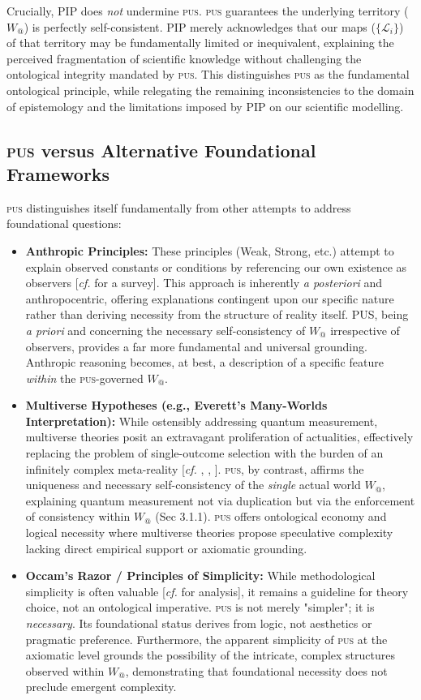 \documentclass[11pt, a4paper]{article}
\makeatletter
\newcommand{\pus}{\textsc{pus}} %
\newcommand{\Wactual}{W_{@}} %
\newcommand{\LangSet}{\{\mathcal{L}_i\}} %
\makeatother
\begin{document}
Crucially, PIP does \textit{not} undermine \pus. \pus{} guarantees the underlying territory ($\Wactual$) is perfectly self-consistent. PIP merely acknowledges that our maps ($\LangSet$) of that territory may be fundamentally limited or inequivalent, explaining the perceived fragmentation of scientific knowledge without challenging the ontological integrity mandated by \pus. This distinguishes \pus{} as the fundamental ontological principle, while relegating the remaining inconsistencies to the domain of epistemology and the limitations imposed by PIP on our scientific modelling.

\subsection{\pus{} versus Alternative Foundational Frameworks}
\pus{} distinguishes itself fundamentally from other attempts to address foundational questions:
\begin{itemize}
    \item \textbf{Anthropic Principles:} These principles (Weak, Strong, etc.) attempt to explain observed constants or conditions by referencing our own existence as observers [\textit{cf.} \citealp{barrow1986} for a survey]. This approach is inherently \textit{a posteriori} and anthropocentric, offering explanations contingent upon our specific nature rather than deriving necessity from the structure of reality itself. PUS, being \textit{a priori} and concerning the necessary self-consistency of $\Wactual$ irrespective of observers, provides a far more fundamental and universal grounding. Anthropic reasoning becomes, at best, a description of a specific feature \textit{within} the \pus-governed $\Wactual$.
    \item \textbf{Multiverse Hypotheses (e.g., Everett's Many-Worlds Interpretation):} While ostensibly addressing quantum measurement, multiverse theories posit an extravagant proliferation of actualities, effectively replacing the problem of single-outcome selection with the burden of an infinitely complex meta-reality [\textit{cf.} \citealp{everett1957}, \citealp{deutsch1997}, \citealp{lewis1986}]. \pus, by contrast, affirms the uniqueness and necessary self-consistency of the \textit{single} actual world $\Wactual$, explaining quantum measurement not via duplication but via the enforcement of consistency within $\Wactual$ (Sec 3.1.1). \pus{} offers ontological economy and logical necessity where multiverse theories propose speculative complexity lacking direct empirical support or axiomatic grounding.
    \item \textbf{Occam's Razor / Principles of Simplicity:} While methodological simplicity is often valuable [\textit{cf.} \citealp{sober2015} for analysis], it remains a guideline for theory choice, not an ontological imperative. \pus{} is not merely "simpler"; it is \textit{necessary}. Its foundational status derives from logic, not aesthetics or pragmatic preference. Furthermore, the apparent simplicity of \pus{} at the axiomatic level grounds the possibility of the intricate, complex structures observed within $\Wactual$, demonstrating that foundational necessity does not preclude emergent complexity.
\end{itemize}
\end{document}
